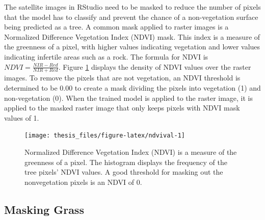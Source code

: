 \documentclass[12pt,twoside]{reedthesis}
\begin{document}
The satellite images in RStudio need to be masked to reduce the number of pixels that the model has to classify and prevent the chance of a non-vegetation surface being predicted as a tree. A common mask applied to raster images is a Normalized Difference Vegetation Index (NDVI) mask. This index is a measure of the greenness of a pixel, with higher values indicating vegetation and lower values indicating infertile areas such as a rock. The formula for NDVI is \(NDVI = \frac{NIR - Red}{NIR + Red}\). Figure \ref{fig:ndvival} displays the density of NDVI values over the raster images. To remove the pixels that are not vegetation, an NDVI threshold is determined to be 0.00 to create a mask dividing the pixels into vegetation (1) and non-vegetation (0). When the trained model is applied to the raster image, it is applied to the masked raster image that only keeps pixels with NDVI mask values of 1.
\begin{figure}

{\centering \texttt{[image: thesis\_files/figure-latex/ndvival-1]} 

}

\caption{Normalized Difference Vegetation Index (NDVI) is a measure of the greenness of a pixel. The histogram displays the frequency of the tree pixels' NDVI values. A good threshold for masking out the nonvegetation pixels is an NDVI of 0.}\label{fig:ndvival}
\end{figure}
\hypertarget{masking-grass}{%
\subsection{Masking Grass}\label{masking-grass}}
\end{document}
